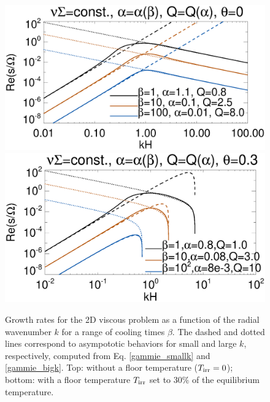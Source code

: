 \begin{figure}
  \includegraphics[width=\linewidth,clip=true,trim=0cm 2cm 0cm
    0.0cm]{figures/viscsg_modes}\\
  \includegraphics[width=\linewidth,clip=true,trim=0cm 0cm 0.cm
    0.0cm]{figures/viscsg_modes_theta0d3}
  \caption{Growth rates for the 2D viscous problem as a function of
    the radial wavenumber $k$ for a range of cooling times
    $\beta$. The dashed and dotted lines correspond to asympototic
    behaviors for small and large $k$, respectively, computed from
    Eq. \ref{gammie_smallk} and \ref{gammie_bigk}. Top: without
    a floor temperature ($T_\mathrm{irr} = 0$); bottom: with a floor
    temperature $T_\mathrm{irr}$ set to $30\%$ of the equilibrium temperature.   
    \label{gammie_rate_plot}}
\end{figure}

